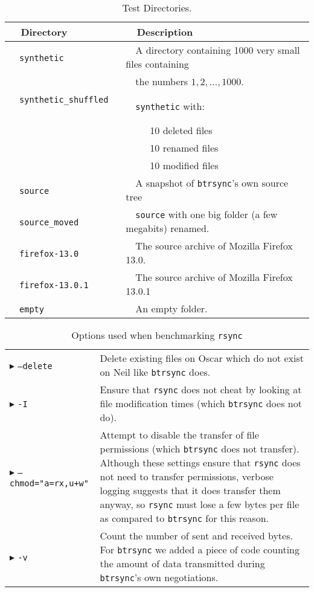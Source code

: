 \documentclass[11pt]{llncs}
\newcommand{\btrsync}{\texttt{btrsync}\xspace}
\newcommand{\rsync}{\texttt{rsync}\xspace}
\begin{document}
\begin{table}
\begin{center}
\begin{tabular}{ll}\toprule
~~{\bf Directory}              ~~&~~{\bf Description}\\\midrule
~~{\tt synthetic}              ~~&~~A directory containing 1000 very small files containing~~\\
~~                             ~~&~~the numbers $1,2,\ldots,1000$. \\
~~{\tt synthetic\_shuffled}    ~~&~~{\tt synthetic} with:\\
                             ~~& ~~~~~10 deleted files\\
                             ~~& ~~~~~10 renamed files \\
                             ~~& ~~~~~10 modified files \\
~~{\tt source}                 ~~& ~~A snapshot of \btrsync's own source tree \\
~~{\tt source\_moved}          ~~& ~~{\tt source} with one big folder (a few megabits) renamed.~~\\
~~{\tt firefox-13.0}           ~~& ~~The source archive of Mozilla Firefox 13.0.\\
~~{\tt firefox-13.0.1}         ~~& ~~The source archive of Mozilla Firefox 13.0.1\\
~~{\tt empty}                  ~~& ~~An empty folder.\\\bottomrule
\end{tabular}\smallskip
  \caption{Test Directories.}
  \label{tab:benchdirec}
\end{center}
\end{table}

\begin{table}
  \begin{tabular}{p{} p{}}
    \toprule
    $\blacktriangleright$ {\tt --delete} & Delete existing files on Oscar which
    do not exist on Neil like \btrsync does.\\
    $\blacktriangleright$ {\tt -I} & Ensure that \rsync does not cheat by
    looking at file modification times (which \btrsync does not do).\\
    $\blacktriangleright$ {\tt --chmod="a=rx,u+w"} & Attempt to disable the
    transfer of file permissions (which \btrsync does not transfer). Although
    these settings ensure that \rsync does not need to transfer permissions,
    verbose logging suggests that it does transfer them anyway, so \rsync must
    lose a few bytes per file as compared to \btrsync for this
    reason.\\
    $\blacktriangleright$ {\tt -v} & Count the number of sent and received
    bytes. For \btrsync we added a piece of code counting the amount of data
    transmitted during \btrsync's own negotiations.\\
    \bottomrule
  \end{tabular}
  \caption{Options used when benchmarking \rsync}
  \label{tab:rsyncopt}
\end{table}
\end{document}
